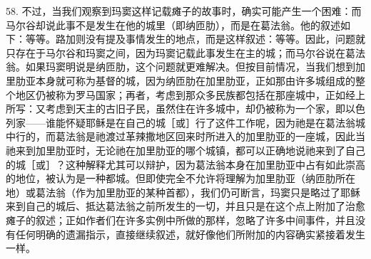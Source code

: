 58. 不过，当我们观察到玛窦这样记载瘫子的故事时，确实可能产生一个困难：而马尔谷却说此事不是发生在他的城里（即纳匝肋），而是在葛法翁。他的叙述如下：等等。路加则没有提及事情发生的地点，而是这样叙述：等等。因此，问题就只存在于马尔谷和玛窦之间，因为玛窦记载此事发生在主的城；而马尔谷说在葛法翁。如果玛窦明说是纳匝肋，这个问题就更难解决。但按目前情况，当我们想到加里肋亚本身就可称为基督的城，因为纳匝肋在加里肋亚，正如那由许多城组成的整个地区仍被称为罗马国家；再者，考虑到那众多民族都包括在那座城中，正如经上所写：又考虑到天主的古旧子民，虽然住在许多城中，却仍被称为一个家，即以色列家——谁能怀疑耶稣是在自己的城［或］行了这件工作呢，因为祂是在葛法翁城中行的，而葛法翁是祂渡过革辣撒地区回来时所进入的加里肋亚的一座城，因此当祂来到加里肋亚时，无论祂在加里肋亚的哪个城镇，都可以正确地说祂来到了自己的城［或］？这种解释尤其可以辩护，因为葛法翁本身在加里肋亚中占有如此崇高的地位，被认为是一种都城。但即使完全不允许将理解为加里肋亚（纳匝肋所在地）或葛法翁（作为加里肋亚的某种首都），我们仍可断言，玛窦只是略过了耶稣来到自己的城后、抵达葛法翁之前所发生的一切，并且只是在这个点上附加了治愈瘫子的叙述；正如作者们在许多实例中所做的那样，忽略了许多中间事件，并且没有任何明确的遗漏指示，直接继续叙述，就好像他们所附加的内容确实紧接着发生一样。\par



\section{}

